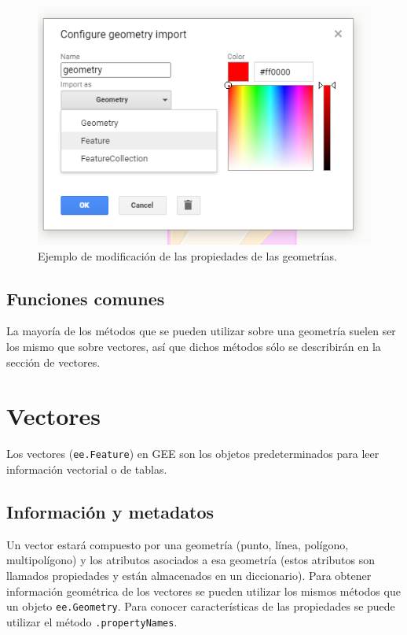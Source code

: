 \documentclass[
  12pt,
  letterpaper,
  twoside]{book}
\begin{document}
\begin{figure}

{\centering \includegraphics[width=0.8\linewidth]{Img/menuGeo} 

}

\caption{Ejemplo de modificación de las propiedades de las geometrías.}\label{fig:unnamed-chunk-62}
\end{figure}

\hypertarget{funciones-comunes}{%
\section{Funciones comunes}\label{funciones-comunes}}

La mayoría de los métodos que se pueden utilizar sobre una geometría suelen ser los mismo que sobre vectores, así que dichos métodos sólo se describirán en la sección de vectores.

\newpage

\hypertarget{vectores}{%
\chapter{Vectores}\label{vectores}}

Los vectores (\texttt{ee.Feature}) en GEE son los objetos predeterminados para leer información vectorial o de tablas.

\hypertarget{informaciuxf3n-y-metadatos-1}{%
\section{Información y metadatos}\label{informaciuxf3n-y-metadatos-1}}

Un vector estará compuesto por una geometría (punto, línea, polígono, multipolígono) y los atributos asociados a esa geometría (estos atributos son llamados propiedades y están almacenados en un diccionario). Para obtener información geométrica de los vectores se pueden utilizar los mismos métodos que un objeto \texttt{ee.Geometry}. Para conocer características de las propiedades se puede utilizar el método \texttt{.propertyNames}.
\end{document}
